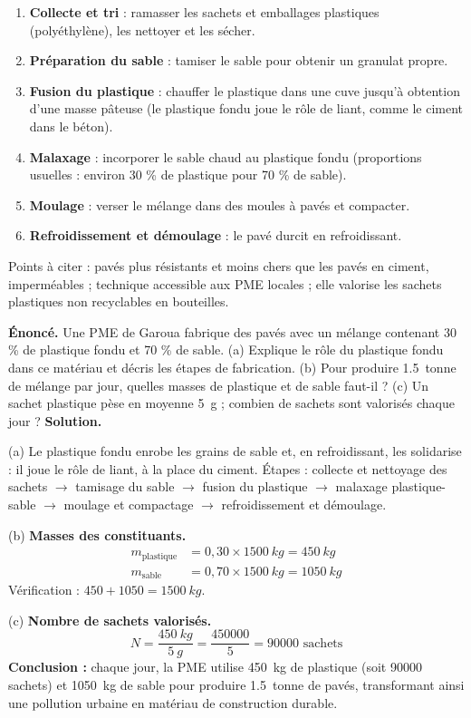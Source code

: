 \documentclass[11pt]{article}
\newcommand{\cle}[1]{{\popxbold\color{popdark}#1}}
\begin{document}
\begin{methode}
\begin{enumerate}
\item \textbf{Collecte et tri} : ramasser les sachets et emballages plastiques (polyéthylène), les nettoyer et les sécher.
\item \textbf{Préparation du sable} : tamiser le sable pour obtenir un granulat propre.
\item \textbf{Fusion du plastique} : chauffer le plastique dans une cuve jusqu'à obtention d'une masse pâteuse (le plastique fondu joue le rôle de \cle{liant}, comme le ciment dans le béton).
\item \textbf{Malaxage} : incorporer le sable chaud au plastique fondu (proportions usuelles : environ 30 \% de plastique pour 70 \% de sable).
\item \textbf{Moulage} : verser le mélange dans des moules à pavés et compacter.
\item \textbf{Refroidissement et démoulage} : le pavé durcit en refroidissant.
\end{enumerate}
Points à citer : pavés plus résistants et moins chers que les pavés en ciment, imperméables ; technique accessible aux PME locales ; elle valorise les sachets plastiques non recyclables en bouteilles.
\end{methode}

\begin{exoresolu}
\textbf{Énoncé.} Une PME de Garoua fabrique des pavés avec un mélange contenant 30 \% de plastique fondu et 70 \% de sable. (a) Explique le rôle du plastique fondu dans ce matériau et décris les étapes de fabrication. (b) Pour produire \SI{1,5}{tonne} de mélange par jour, quelles masses de plastique et de sable faut-il ? (c) Un sachet plastique pèse en moyenne \SI{5}{g} ; combien de sachets sont valorisés chaque jour ?
\tcblower
\textbf{Solution.}

(a) Le plastique fondu enrobe les grains de sable et, en refroidissant, les solidarise : il joue le rôle de \cle{liant}, à la place du ciment. Étapes : collecte et nettoyage des sachets $\rightarrow$ tamisage du sable $\rightarrow$ fusion du plastique $\rightarrow$ malaxage plastique-sable $\rightarrow$ moulage et compactage $\rightarrow$ refroidissement et démoulage.

(b) \textbf{Masses des constituants.}
\begin{align*}
m_{\text{plastique}} &= 0{,}30 \times \SI{1500}{kg} = \SI{450}{kg} \\
m_{\text{sable}} &= 0{,}70 \times \SI{1500}{kg} = \SI{1050}{kg}
\end{align*}
Vérification : $450 + 1050 = \SI{1500}{kg}$.

(c) \textbf{Nombre de sachets valorisés.}
\[ N = \dfrac{\SI{450}{kg}}{\SI{5}{g}} = \dfrac{\num{450000}}{\num{5}} = \num{90000} \text{ sachets} \]
\textbf{Conclusion :} chaque jour, la PME utilise \SI{450}{kg} de plastique (soit \num{90000} sachets) et \SI{1050}{kg} de sable pour produire \SI{1,5}{tonne} de pavés, transformant ainsi une pollution urbaine en matériau de construction durable.
\end{exoresolu}
\end{document}

